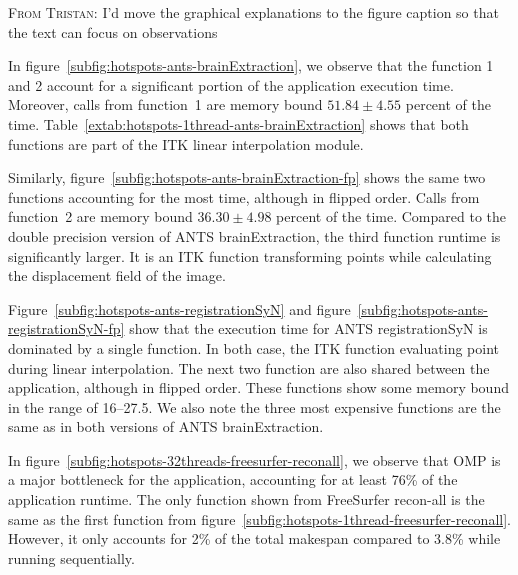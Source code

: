 \documentclass[conference]{IEEEtran}
\newcommand{\TG}[1]{\color{blue}\textsc{From Tristan: }#1\color{black}}
\begin{document}
\TG{I'd move the graphical explanations to the figure caption so that the text can focus on observations}

In figure~\ref{subfig:hotspots-ants-brainExtraction}, we observe that the function 1 and 2 account for a significant portion of the application execution time. Moreover, calls from function~1 are memory bound $51.84\pm{4.55}$ percent of the time. Table~\ref{extab:hotspots-1thread-ants-brainExtraction} shows that both functions are part of the ITK linear interpolation module.

Similarly, figure~\ref{subfig:hotspots-ants-brainExtraction-fp} shows the same two functions accounting for the most time, although in flipped order. Calls from function~2 are memory bound $36.30\pm{4.98}$ percent of the time. Compared to the double precision version of ANTS brainExtraction, the third function runtime is significantly larger. It is an ITK function transforming points while calculating the displacement field of the image.

Figure~\ref{subfig:hotspots-ants-registrationSyN} and figure~\ref{subfig:hotspots-ants-registrationSyN-fp} show that the execution time for ANTS registrationSyN is dominated by a single function. In both case, the ITK function evaluating point during linear interpolation. The next two function are also shared between the application, although in flipped order. These functions show some memory bound in the range of 16--27.5. We also note the three most expensive functions are the same as in both versions of ANTS brainExtraction.


In figure~\ref{subfig:hotspots-32threads-freesurfer-reconall}, we observe that OMP is a major bottleneck for the application, accounting for at least 76\% of the application runtime. The only function shown from FreeSurfer recon-all is the same as the first function from figure~\ref{subfig:hotspots-1thread-freesurfer-reconall}. However, it only accounts for 2\% of the total makespan compared to 3.8\% while running sequentially.
\end{document}
